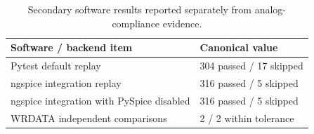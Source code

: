 \begin{table}[t]
\centering
\small
\caption{Secondary software results reported separately from analog-compliance evidence.}
\label{tab:secondary_software_results}
\begin{tabular}{p{}p{}}
\toprule
Software / backend item & Canonical value \\
\midrule
Pytest default replay & 304 passed / 17 skipped \\
ngspice integration replay & 316 passed / 5 skipped \\
ngspice integration with PySpice disabled & 316 passed / 5 skipped \\
WRDATA independent comparisons & 2 / 2 within tolerance \\
\bottomrule
\end{tabular}
\end{table}
